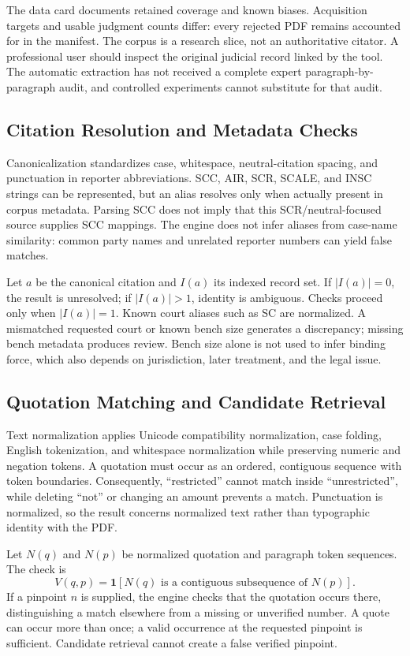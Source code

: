 \documentclass[conference]{IEEEtran}
\begin{document}
The data card documents retained coverage and known biases. Acquisition targets and usable judgment counts differ: every rejected PDF remains accounted for in the manifest. The corpus is a research slice, not an authoritative citator. A professional user should inspect the original judicial record linked by the tool. The automatic extraction has not received a complete expert paragraph-by-paragraph audit, and controlled experiments cannot substitute for that audit.

\subsection{Citation Resolution and Metadata Checks}
Canonicalization standardizes case, whitespace, neutral-citation spacing, and punctuation in reporter abbreviations. SCC, AIR, SCR, SCALE, and INSC strings can be represented, but an alias resolves only when actually present in corpus metadata. Parsing SCC does not imply that this SCR/neutral-focused source supplies SCC mappings. The engine does not infer aliases from case-name similarity: common party names and unrelated reporter numbers can yield false matches.

Let $a$ be the canonical citation and $I(a)$ its indexed record set. If $|I(a)|=0$, the result is unresolved; if $|I(a)|>1$, identity is ambiguous. Checks proceed only when $|I(a)|=1$. Known court aliases such as SC are normalized. A mismatched requested court or known bench size generates a discrepancy; missing bench metadata produces review. Bench size alone is not used to infer binding force, which also depends on jurisdiction, later treatment, and the legal issue.

\subsection{Quotation Matching and Candidate Retrieval}
Text normalization applies Unicode compatibility normalization, case folding, English tokenization, and whitespace normalization while preserving numeric and negation tokens. A quotation must occur as an ordered, contiguous sequence with token boundaries. Consequently, ``restricted'' cannot match inside ``unrestricted'', while deleting ``not'' or changing an amount prevents a match. Punctuation is normalized, so the result concerns normalized text rather than typographic identity with the PDF.

Let $N(q)$ and $N(p)$ be normalized quotation and paragraph token sequences. The check is
\begin{equation}
V(q,p)=\mathbf{1}[N(q)\text{ is a contiguous subsequence of }N(p)].
\end{equation}
If a pinpoint $n$ is supplied, the engine checks that the quotation occurs there, distinguishing a match elsewhere from a missing or unverified number. A quote can occur more than once; a valid occurrence at the requested pinpoint is sufficient. Candidate retrieval cannot create a false verified pinpoint.
\end{document}
